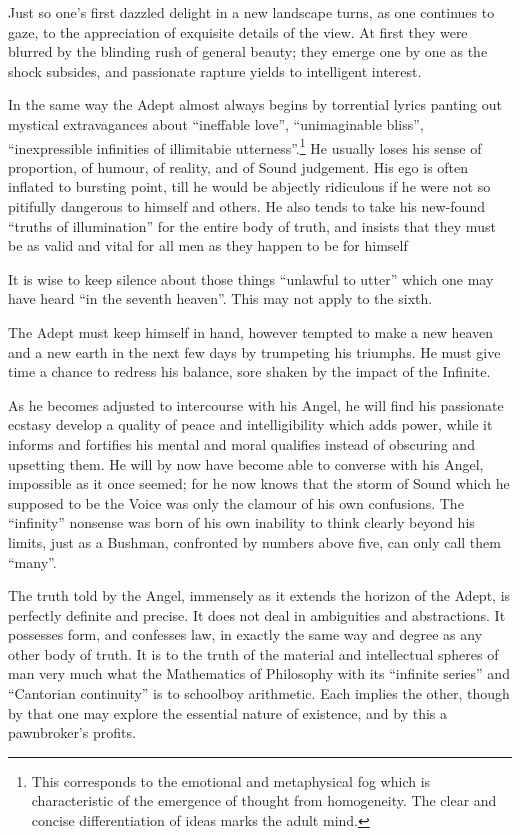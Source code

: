 Just so one's first dazzled delight in a new landscape turns, as one continues to gaze, to the appreciation of exquisite details of the view. At first they were blurred by the blinding rush of general beauty; they emerge one by one as the shock subsides, and passionate rapture yields to intelligent interest.

In the same way the Adept almost always begins by torrential lyrics panting out mystical extravagances about \enquote{ineffable love}, \enquote{unimaginable bliss}, \enquote{inexpressible infinities of illimitabie utterness}.\footnote{This corresponds to the emotional and metaphysical fog which is characteristic of the emergence of thought from homogeneity. The clear and concise differentiation of ideas marks the adult mind.} He usually loses his sense of proportion, of humour, of reality, and of Sound judgement. His ego is often inflated to bursting point, till he would be abjectly ridiculous if he were not so pitifully dangerous to himself and others. He also tends to take his new-found \enquote{truths of illumination} for the entire body of truth, and insists that they must be as valid and vital for all men as they happen to be for himself

It is wise to keep silence about those things \enquote{unlawful to utter} which one may have heard \enquote{in the seventh heaven}. This may not apply to the sixth.

The Adept must keep himself in hand, however tempted to make a new heaven and a new earth in the next few days by trumpeting his triumphs. He must give time a chance to redress his balance, sore shaken by the impact of the Infinite.

As he becomes adjusted to intercourse with his Angel, he will find his passionate ecstasy develop a quality of peace and intelligibility which adds power, while it informs and fortifies his mental and moral qualifies instead of obscuring and upsetting them. He will by now have become able to converse with his Angel, impossible as it once seemed; for he now knows that the storm of Sound which he supposed to be the Voice was only the clamour of his own confusions. The \enquote{infinity} nonsense was born of his own inability to think clearly beyond his limits, just as a Bushman, confronted by numbers above five, can only call them \enquote{many}.

The truth told by the Angel, immensely as it extends the horizon of the Adept, is perfectly definite and precise. It does not deal in ambiguities and abstractions. It possesses form, and confesses law, in exactly the same way and degree as any other body of truth. It is to the truth of the material and intellectual spheres of man very much what the Mathematics of Philosophy with its \enquote{infinite series} and \enquote{Cantorian continuity} is to schoolboy arithmetic. Each implies the other, though by that one may explore the essential nature of existence, and by this a pawnbroker's profits.

